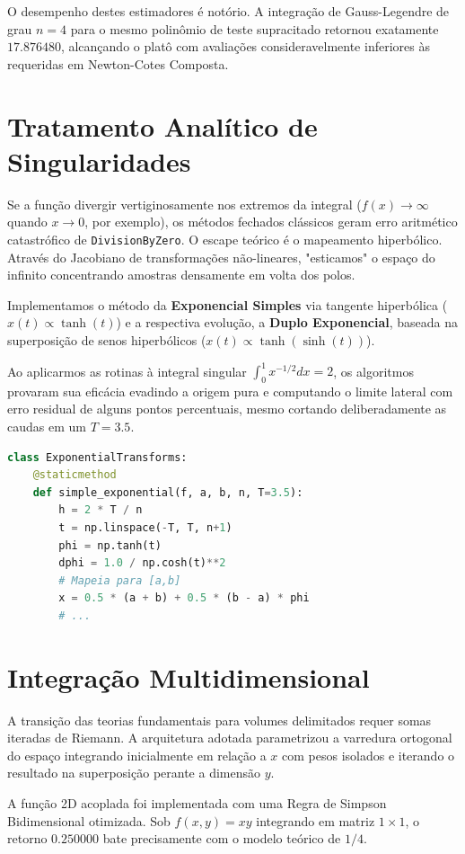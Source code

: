 \documentclass[12pt,a4paper]{article}
\begin{document}
O desempenho destes estimadores é notório. A integração de Gauss-Legendre de grau $n=4$ para o mesmo polinômio de teste supracitado retornou exatamente $17.876480$, alcançando o platô com avaliações consideravelmente inferiores às requeridas em Newton-Cotes Composta.

\section{Tratamento Analítico de Singularidades}
Se a função divergir vertiginosamente nos extremos da integral ($f(x) \to \infty$ quando $x \to 0$, por exemplo), os métodos fechados clássicos geram erro aritmético catastrófico de \texttt{DivisionByZero}. 
O escape teórico é o mapeamento hiperbólico. Através do Jacobiano de transformações não-lineares, "esticamos" o espaço do infinito concentrando amostras densamente em volta dos polos. 

Implementamos o método da \textbf{Exponencial Simples} via tangente hiperbólica ($x(t) \propto \tanh(t)$) e a respectiva evolução, a \textbf{Duplo Exponencial}, baseada na superposição de senos hiperbólicos ($x(t) \propto \tanh(\sinh(t))$).

Ao aplicarmos as rotinas à integral singular $\int_0^1 x^{-1/2}dx = 2$, os algoritmos provaram sua eficácia evadindo a origem pura e computando o limite lateral com erro residual de alguns pontos percentuais, mesmo cortando deliberadamente as caudas em um $T=3.5$.

\begin{lstlisting}[language=Python, caption={Trecho: Transformação Exponencial Simples.}]
class ExponentialTransforms:
    @staticmethod
    def simple_exponential(f, a, b, n, T=3.5):
        h = 2 * T / n
        t = np.linspace(-T, T, n+1)
        phi = np.tanh(t)
        dphi = 1.0 / np.cosh(t)**2
        # Mapeia para [a,b]
        x = 0.5 * (a + b) + 0.5 * (b - a) * phi
        # ...
\end{lstlisting}

\section{Integração Multidimensional}
A transição das teorias fundamentais para volumes delimitados requer somas iteradas de Riemann. A arquitetura adotada parametrizou a varredura ortogonal do espaço integrando inicialmente em relação a $x$ com pesos isolados e iterando o resultado na superposição perante a dimensão $y$. 

A função 2D acoplada foi implementada com uma Regra de Simpson Bidimensional otimizada. Sob $f(x,y) = xy$ integrando em matriz $1 \times 1$, o retorno $0.250000$ bate precisamente com o modelo teórico de $1/4$.
\end{document}
